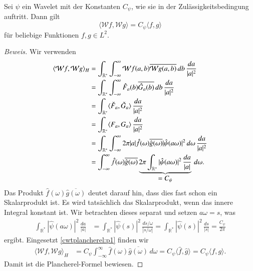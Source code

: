 \begin{satz}
\label{satz:wplancherel}
Sei $\psi$ ein Wavelet mit der Konstanten $C_{\psi}$, wie sie in
der Zulässigkeitsbedingung auftritt.
Dann gilt
\begin{equation}
\langle \mathcal{W}f,\mathcal{W}g\rangle
=
C_{\psi}\langle f,g\rangle
\end{equation}
für beliebige Funktionen $f,g\in L^2$.
\end{satz}

\begin{proof}[Beweis]
Wir verwenden 
\begin{align}
\langle \mathcal{W}f, \mathcal{W}g\rangle_H
&=
\int_{\mathbb R^*} \int_{-\infty}^\infty
\mathcal{W}f (a,b)
\overline{\mathcal{W}g (a,b)} \,db \,\frac{da}{|a|^2}
\notag
\\
&=
\int_{\mathbb R^*} \int_{-\infty}^\infty
\hat{F}_a(b) \overline{\hat{G}_a(b)}\,db\,\frac{da}{|a|^2}
\notag
\\
&=
\int_{\mathbb R^*} 
\langle
\check{F}_a,\check{G}_a
\rangle
\,\frac{da}{|a|^2}
\notag
\\
&=
\int_{\mathbb R^*} \langle F_a, G_a\rangle \,\frac{da}{|a|^2}
\notag
\\
&=
\int_{\mathbb R^*}
\int_{-\infty}^\infty
2\pi |a|\hat{f}(\omega) \overline{\hat{g}(\omega)} |\hat{\psi}(a\omega)|^2
\,d\omega
\,\frac{da}{|a|^2}
\notag
\\
&=
\int_{-\infty}^\infty
\hat{f}(\omega) \overline{\hat{g}(\omega)}
\underbrace{
2\pi
\int_{\mathbb R^*}
|\hat{\psi}(a\omega)|^2
\,\frac{da}{|a|}}_{\displaystyle=C_\psi}
\,d\omega.
\label{cwtplancherel:p1}
\end{align}
Das Produkt $\hat{f}(\omega)\overline{\hat{g}(\omega)}$ deutet darauf hin,
dass dies fast schon ein Skalarprodukt ist.
Es wird tatsächlich das Skalarprodukt, wenn das innere Integral konstant ist.
Wir betrachten dieses separat und setzen $a\omega = s$, was
\begin{align*}
\int_{\mathbb R^*} |\hat{\psi}(a\omega)|^2 \,\frac{da}{|a|}
&=
\int_{\mathbb R^*} |\hat{\psi}(s)|^2 \,\frac{ds/\omega}{|s/\omega|}
=
\int_{\mathbb R^*} |\hat{\psi}(s)|^2 \,\frac{ds}{|s|}
=
\frac{C_{\psi}}{2\pi}
\end{align*}
ergibt.
Eingesetzt \eqref{cwtplancherel:p1} finden wir
\begin{align*}
\langle \mathcal{W}f, \mathcal{W}g\rangle_H
&=
C_{\psi}
\int_{-\infty}^\infty \hat{f}(\omega)\overline{\hat{g}(\omega)}\,d\omega
=
C_{\psi}
\langle \hat{f},\hat{g}\rangle
=
C_{\psi}
\langle f,g\rangle.
\end{align*}
Damit ist die Plancherel-Formel bewiesen.
\end{proof}

